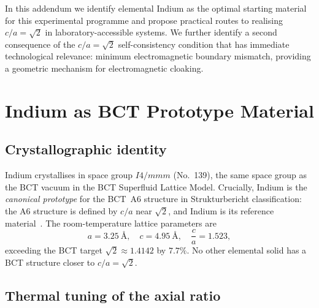 \documentclass[aps,prl,twocolumn,superscriptaddress,floatfix]{revtex4-2}
\begin{document}
In this addendum we identify elemental Indium as the optimal starting
material for this experimental programme and propose practical routes
to realising $c/a = \sqrt{2}$ in laboratory-accessible systems.
We further identify a second consequence of the $c/a = \sqrt{2}$
self-consistency condition that has immediate technological relevance:
minimum electromagnetic boundary mismatch, providing a geometric
mechanism for electromagnetic cloaking.

\section{Indium as BCT Prototype Material}

\subsection{Crystallographic identity}

Indium crystallises in space group $I4/mmm$ (No.~139), the same space
group as the BCT vacuum in the BCT Superfluid Lattice Model.
Crucially, Indium is the \emph{canonical prototype} for the BCT~A6
structure in Strukturbericht classification: the A6 structure is
defined by $c/a$ near $\sqrt{2}$, and Indium is its reference
material~\cite{aflow_indium}.
The room-temperature lattice parameters are~\cite{wiki_indium}
\begin{equation}
  a = 3.25\ \text{\AA},\quad c = 4.95\ \text{\AA},\quad
  \frac{c}{a} = 1.523,
\end{equation}
exceeding the BCT target $\sqrt{2} \approx 1.4142$ by $7.7\%$.
No other elemental solid has a BCT structure closer to $c/a = \sqrt{2}$.

\subsection{Thermal tuning of the axial ratio}
\end{document}
